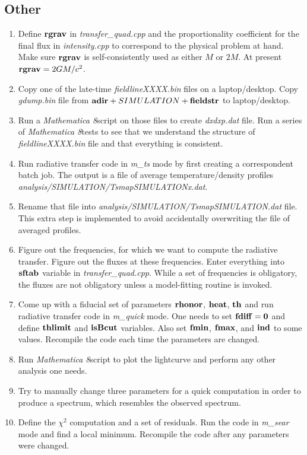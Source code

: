\documentclass{emulateapj}
\newcommand{\mat}{\textit{Mathematica 8}}
\begin{document}
\subsection{Other}
\begin{enumerate}
\item{Define ${\bf rgrav}$ in \textit{transfer\_quad.cpp} and the proportionality coefficient for the final flux in \textit{intensity.cpp} to correspond to the physical problem at hand.
Make sure ${\bf rgrav}$ is self-consistently used as either $M$ or $2M$. At present ${\bf rgrav}=2GM/c^2$.}
\item{Copy one of the late-time \textit{fieldlineXXXX.bin} files on a laptop/desktop. Copy \textit{gdump.bin} file from ${\bf adir}+ SIMULATION +{\bf fieldstr}$ to laptop/desktop.}
\item{Run a \mat script on those files to create \textit{dxdxp.dat} file. Run a series of \mat tests to see that we understand the structure of \textit{fieldlineXXXX.bin} file and
that everything is consistent.}
\item{Run radiative transfer code in \textit{m\_ts} mode by first creating a correspondent batch job. The output is a file of average temperature/density profiles 
\textit{analysis/SIMULATION/TsmapSIMULATIONx.dat}.}
\item{Rename that file into \textit{analysis/SIMULATION/TsmapSIMULATION.dat} file. This extra step is implemented to avoid accidentally overwriting the file of averaged profiles.}
\item{Figure out the frequencies, for which we want to compute the radiative transfer. Figure out the fluxes at these frequencies. Enter everything into ${\bf sftab}$ variable in
\textit{transfer\_quad.cpp}. While a set of frequencies is obligatory, the fluxes are not obligatory unless a model-fitting routine is invoked.}
\item{Come up with a fiducial set of parameters $\bf rhonor$, $\bf heat$, $\bf th$ and run radiative transfer code in \textit{m\_quick} mode. One needs to set $\bf fdiff=0$ and
define $\bf thlimit$ and $\bf isBcut$ variables. Also set ${\bf fmin}$, ${\bf fmax}$, and ${\bf ind}$ to some values. Recompile the code each time the parameters are changed.}
\item{Run \mat script to plot the lightcurve and perform any other analysis one needs.}
\item{Try to manually change three parameters for a quick computation in order to produce a spectrum, which resembles the observed spectrum.}
\item{Define the $\chi^2$ computation and a set of residuals.  Run the code in \textit{m\_sear} mode and find a local minimum. Recompile the code after any parameters were changed.
}
\end{enumerate}
\end{document}
